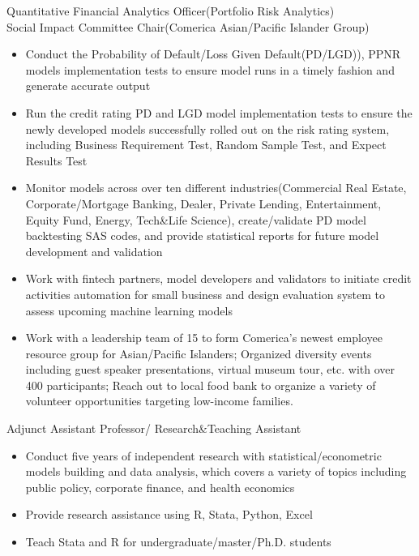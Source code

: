 \documentclass{resume}
\begin{document}
Quantitative Financial Analytics Officer(Portfolio Risk Analytics)\\
Social Impact Committee Chair(Comerica Asian/Pacific Islander Group)
\begin{itemize}
  \item Conduct the Probability of Default/Loss Given Default(PD/LGD)), PPNR models implementation tests to ensure model runs in a timely fashion and generate accurate output
  \item Run the credit rating PD and LGD model implementation tests to ensure the newly developed models successfully rolled out on the risk rating system, including Business Requirement Test, Random Sample Test, and Expect Results Test
  \item Monitor models across over ten different industries(Commercial Real Estate, Corporate/Mortgage Banking, Dealer, Private Lending, Entertainment, Equity Fund, Energy, Tech\&Life Science), create/validate PD model backtesting SAS codes, and provide statistical reports for future model development and validation
  \item Work with fintech partners, model developers and validators to initiate credit activities automation for small business and design evaluation system to assess upcoming machine learning models
  \item Work with a leadership team of 15 to form Comerica's newest employee resource group for Asian/Pacific Islanders; Organized diversity events including guest speaker presentations, virtual museum tour, etc. with over 400 participants; Reach out to local food bank to organize a variety of volunteer opportunities targeting low-income families.
\end{itemize}

Adjunct Assistant Professor/ Research\&Teaching Assistant
\begin{itemize}
  \item Conduct five years of independent research with statistical/econometric models building and data analysis, which covers a variety of topics including public policy, corporate finance, and health economics
  \item Provide research assistance using R, Stata, Python, Excel
  \item Teach Stata and R for undergraduate/master/Ph.D. students
\end{itemize}
\end{document}
